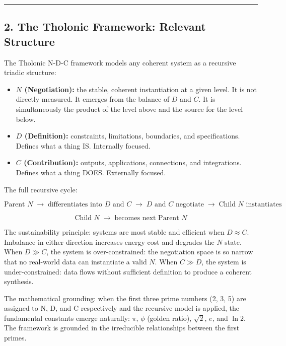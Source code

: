 \documentclass[
  11pt,
  letterpaper,
]{article}
\providecommand{\tightlist}{%
  \setlength{\itemsep}{0pt}\setlength{\parskip}{0pt}}
\begin{document}
\begin{center}\rule{0.5\linewidth}{0.5pt}\end{center}

\subsection{2. The Tholonic Framework: Relevant
Structure}\label{the-tholonic-framework-relevant-structure}

The Tholonic N-D-C framework models any coherent system as a recursive
triadic structure:

\begin{itemize}
\tightlist
\item
  \textbf{\(N\) (Negotiation):} the stable, coherent instantiation at a
  given level. It is not directly measured. It emerges from the balance
  of \(D\) and \(C\). It is simultaneously the product of the level
  above and the source for the level below.
\item
  \textbf{\(D\) (Definition):} constraints, limitations, boundaries, and
  specifications. Defines what a thing IS. Internally focused.
\item
  \textbf{\(C\) (Contribution):} outputs, applications, connections, and
  integrations. Defines what a thing DOES. Externally focused.
\end{itemize}

The full recursive cycle:

\[\text{Parent } N \;\to\; \text{differentiates into } D \text{ and } C \;\to\; D \text{ and } C \text{ negotiate} \;\to\; \text{Child } N \text{ instantiates}\]

\[\text{Child } N \;\to\; \text{becomes next Parent } N\]

The sustainability principle: systems are most stable and efficient when
\(D \approx C\). Imbalance in either direction increases energy cost and
degrades the \(N\) state. When \(D \gg C\), the system is
over-constrained: the negotiation space is so narrow that no real-world
data can instantiate a valid \(N\). When \(C \gg D\), the system is
under-constrained: data flows without sufficient definition to produce a
coherent synthesis.

The mathematical grounding: when the first three prime numbers (2, 3, 5)
are assigned to N, D, and C respectively and the recursive model is
applied, the fundamental constants emerge naturally: \(\pi\), \(\phi\)
(golden ratio), \(\sqrt{2}\), \(e\), and \(\ln 2\). The framework is
grounded in the irreducible relationships between the first primes.
\end{document}
